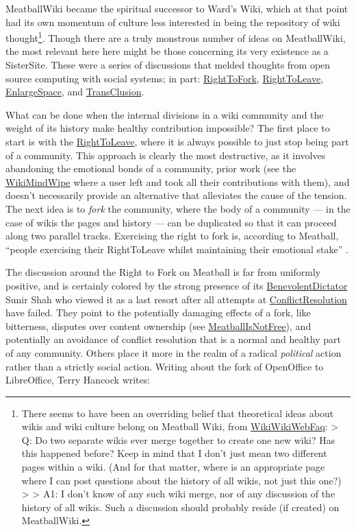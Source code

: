 \documentclass[notoc]{tufte-book}
\begin{document}
MeatballWiki became the spiritual successor to Ward's Wiki, which at
that point had its own momentum of culture less interested in being the
repository of wiki thought\footnote{There seems to have been an
  overriding belief that theoretical ideas about wikis and wiki culture
  belong on Meatball Wiki, from
  \href{http://wiki.c2.com/?WikiWikiWebFaq}{WikiWikiWebFaq}:
  \textgreater{} Q: Do two separate wikis ever merge together to create
  one new wiki? Has this happened before? Keep in mind that I don't just
  mean two different pages within a wiki. (And for that matter, where is
  an appropriate page where I can post questions about the history of
  all wikis, not just this one?) \textgreater{} \textgreater{} A1: I
  don't know of any such wiki merge, nor of any discussion of the
  history of all wikis. Such a discussion should probably reside (if
  created) on MeatballWiki.}. Though there are a truly monstrous number
of ideas on MeatballWiki, the most relevant here here might be those
concerning its very existence as a SisterSite. These were a series of
discussions that melded thoughts from open source computing with social
systems; in part:
\href{http://meatballwiki.org/wiki/RightToFork}{RightToFork},
\href{http://meatballwiki.org/wiki/RightToLeave}{RightToLeave},
\href{http://meatballwiki.org/wiki/EnlargeSpace}{EnlargeSpace}, and
\href{http://meatballwiki.org/wiki/TransClusion}{TransClusion}.

What can be done when the internal divisions in a wiki community and the
weight of its history make healthy contribution impossible? The first
place to start is with the
\href{http://meatballwiki.org/wiki/RightToLeave}{RightToLeave}, where it
is always possible to just stop being part of a community. This approach
is clearly the most destructive, as it involves abandoning the emotional
bonds of a community, prior work (see the
\href{http://wiki.c2.com/?WikiMindWipe}{WikiMindWipe} where a user left
and took all their contributions with them), and doesn't necessarily
provide an alternative that alleviates the cause of the tension. The
next idea is to \emph{fork} the community, where the body of a community
--- in the case of wikis the pages and history --- can be duplicated so
that it can proceed along two parallel tracks. Exercising the right to
fork is, according to Meatball, ``people exercising their RightToLeave
whilst maintaining their emotional stake'' \citep{MeatballWikiRightToLeave} .

The discussion around the Right to Fork on Meatball is far from
uniformly positive, and is certainly colored by the strong presence of
its
\href{http://meatballwiki.org/wiki/BenevolentDictator}{BenevolentDictator}
Sunir Shah who viewed it as a last resort after all attempts at
\href{http://meatballwiki.org/wiki/ConflictResolution}{ConflictResolution}
have failed. They point to the potentially damaging effects of a fork,
like bitterness, disputes over content ownership (see
\href{http://meatballwiki.org/wiki/MeatballIsNotFree}{MeatballIsNotFree}),
and potentially an avoidance of conflict resolution that is a normal and
healthy part of any community. Others place it more in the realm of a
radical \emph{political} action rather than a strictly social action.
Writing about the fork of OpenOffice to LibreOffice, Terry Hancock
writes:
\end{document}
